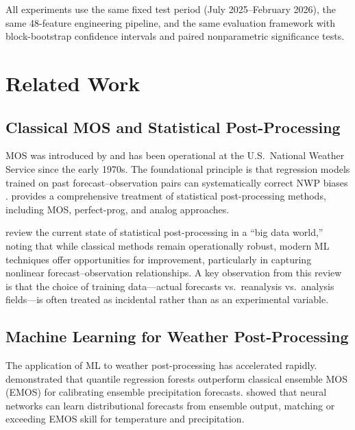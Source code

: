 \documentclass[12pt, letterpaper]{article}
\begin{document}
All experiments use the same fixed test period (July 2025--February 2026), the same
48-feature engineering pipeline, and the same evaluation framework with
block-bootstrap confidence intervals and paired nonparametric significance tests.

\section{Related Work}
\label{sec:related}

\subsection{Classical MOS and Statistical Post-Processing}

MOS was introduced by \citet{glahn1972mos} and has been operational at the U.S.\
National Weather Service since the early 1970s. The foundational principle is that
regression models trained on past forecast--observation pairs can systematically
correct NWP biases \citep{carter1989mos}. \citet{wilks2011statistical} provides a
comprehensive treatment of statistical post-processing methods, including MOS,
perfect-prog, and analog approaches.

\citet{vannitsem2021statistical} review the current state of statistical
post-processing in a ``big data world,'' noting that while classical methods remain
operationally robust, modern ML techniques offer opportunities for improvement,
particularly in capturing nonlinear forecast--observation relationships. A key
observation from this review is that the choice of training data---actual forecasts
vs.\ reanalysis vs.\ analysis fields---is often treated as incidental rather than
as an experimental variable.

\subsection{Machine Learning for Weather Post-Processing}

The application of ML to weather post-processing has accelerated rapidly.
\citet{taillardat2016calibrated} demonstrated that quantile regression forests
outperform classical ensemble MOS (EMOS) for calibrating ensemble precipitation
forecasts. \citet{rasp2018neural} showed that neural networks can learn
distributional forecasts from ensemble output, matching or exceeding EMOS skill
for temperature and precipitation.
\end{document}
